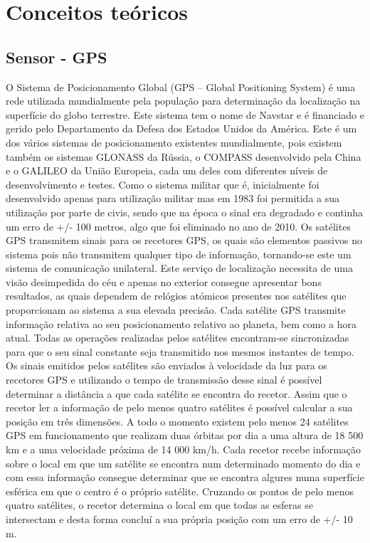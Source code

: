 \chapter{Conceitos teóricos}
\label{cha:conceitos_teoricos}

\section{Sensor - GPS}
\label{sec:gps}

O Sistema de Posicionamento Global (GPS – Global Positioning System) é uma rede utilizada mundialmente pela população para determinação da localização na superfície do globo terrestre. 
Este sistema tem o nome de Navstar e é financiado e gerido pelo Departamento da Defesa dos Estados Unidos da América.
Este é um dos vários sistemas de posicionamento existentes mundialmente, pois existem também os sistemas GLONASS da Rússia, o COMPASS desenvolvido pela China e o GALILEO da União Europeia, cada um deles com diferentes níveis de desenvolvimento e testes.
Como o sistema militar que é, inicialmente foi desenvolvido apenas para utilização militar mas em 1983 foi permitida a sua utilização por parte de civis, sendo que na época o sinal era degradado e continha um erro de +/- 100 metros, algo que foi eliminado no ano de 2010.
Os satélites GPS transmitem sinais para os recetores GPS, os quais são elementos passivos no sistema pois não transmitem qualquer tipo de informação, tornando-se este um sistema de comunicação unilateral.
Este serviço de localização necessita de uma visão desimpedida do céu e apenas no exterior consegue apresentar bons resultados, as quais dependem de relógios atómicos presentes nos satélites que proporcionam ao sistema a sua elevada precisão.
Cada satélite GPS transmite informação relativa ao seu posicionamento relativo ao planeta, bem como a hora atual.
Todas as operações realizadas pelos satélites encontram-se sincronizadas para que o seu sinal constante seja transmitido nos mesmos instantes de tempo.
Os sinais emitidos pelos satélites são enviados à velocidade da luz para os recetores GPS e utilizando o tempo de transmissão desse sinal é possível determinar a distância a que cada satélite se encontra do recetor.
Assim que o recetor ler a informação de pelo menos quatro satélites é possível calcular a sua posição em três dimensões.
A todo o momento existem pelo menos 24 satélites GPS em funcionamento que realizam duas órbitas por dia a uma altura de 18 500 km e a uma velocidade próxima de 14 000 km/h.
Cada recetor recebe informação sobre o local em que um satélite se encontra num determinado momento do dia e com essa informação consegue determinar que se encontra algures numa superfície esférica em que o centro é o próprio satélite.
Cruzando os pontos de pelo menos quatro satélites, o recetor determina o local em que todas as esferas se intersectam e desta forma concluí a sua própria posição com um erro de +/- 10 m.

